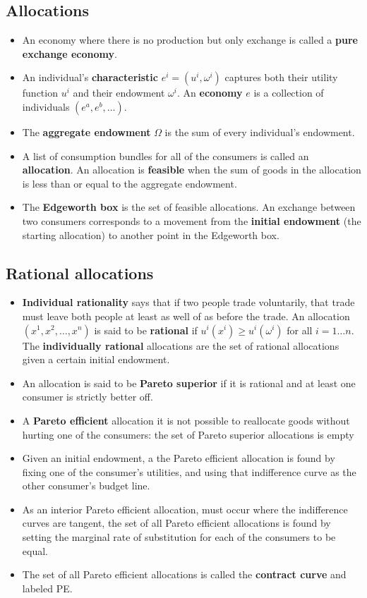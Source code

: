 \documentclass[a4paper]{article}
\begin{document}
\subsection{Allocations}
\begin{itemize}
    \item An economy where there is no production but only exchange is called a \textbf{pure exchange economy}.
    \item An individual's \textbf{characteristic} $e^i = (u^i, \omega^i)$ captures both their utility function $u^i$ and their endowment $\omega^i$. An \textbf{economy} $e$ is a collection of individuals $(e^a, e^b, \hdots)$.
    \item The \textbf{aggregate endowment} $\Omega$ is the sum of every individual's endowment.
    \item A list of consumption bundles for all of the consumers is called an \textbf{allocation}. An allocation is \textbf{feasible} when the sum of goods in the allocation is less than or equal to the aggregate endowment.
    \item The \textbf{Edgeworth box} is the set of feasible allocations. An exchange between two consumers corresponds to a movement from the \textbf{initial endowment} (the starting allocation) to another point in the Edgeworth box.
\end{itemize}

\subsection{Rational allocations}
\begin{itemize}
    \item \textbf{Individual rationality} says that if two people trade voluntarily, that trade must leave both people at least as well of as before the trade. An allocation $(x^1, x^2, \hdots, x^n)$ is said to be \textbf{rational} if $u^i(x^i) \geq u^i(\omega^i)$ for all $i = 1 \hdots n$. The \textbf{individually rational} allocations are the set of rational allocations given a certain initial endowment.
    \item An allocation is said to be \textbf{Pareto superior} if it is rational and at least one consumer is strictly better off.
    \item A \textbf{Pareto efficient} allocation it is not possible to reallocate goods without hurting one of the consumers: the set of Pareto superior allocations is empty
    \item Given an initial endowment, a the Pareto efficient allocation is found by fixing one of the consumer's utilities, and using that indifference curve as the other consumer's budget line.
    \item As an interior Pareto efficient allocation, must occur where the indifference curves are tangent, the set of all Pareto efficient allocations is found by setting the marginal rate of substitution for each of the consumers to be equal.
    \item The set of all Pareto efficient allocations is called the \textbf{contract curve} and labeled PE.
\end{itemize}
\end{document}
